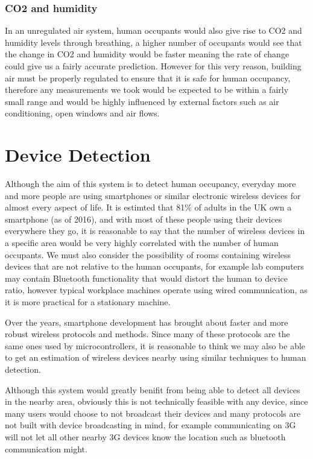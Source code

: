 \documentclass{l4proj}
\begin{document}
\subsubsection{CO2 and humidity}
In an unregulated air system, human occupants would also give rise to CO2 and humidity levels through breathing, a higher number of occupants would see that the change in CO2 and humidity would be faster meaning the rate of change could give us a fairly accurate prediction. However for this very reason, building air must be properly regulated to ensure that it is safe for human occupancy, therefore any measurements we took would be expected to be within a fairly small range and would be highly influenced by external factors such as air conditioning, open windows and air flows.


\section{Device Detection}
Although the aim of this system is to detect human occupancy, everyday more and more people are using smartphones or similar electronic wireless devices for almost every aspect of life. It is estimted that 81\% of adults in the UK own a smartphone (as of 2016)\cite{c-phones}, and with most of these people using their devices everywhere they go, it is reasonable to say that the number of wireless devices in a specific area would be very highly correlated with the number of human occupants. We must also consider the possibility of rooms containing wireless devices that are not relative to the human occupants, for example lab computers may contain Bluetooth functionality that would distort the human to device ratio, however typical workplace machines operate using wired communication, as it is more practical for a stationary machine.

Over the years, smartphone development has brought about faster and more robust wireless protocols and methods. Since many of these protocols are the same ones used by microcontrollers, it is reasonable to think we may also be able to get an estimation of wireless devices nearby using similar techniques to human detection.

Although this system would greatly benifit from being able to detect all devices in the nearby area, obviously this is not technically feasible with any device, since many users would choose to not broadcast their devices and many protocols are not built with device broadcasting in mind, for example communicating on 3G will not let all other nearby 3G devices know the location such as bluetooth communication might.
\end{document}
